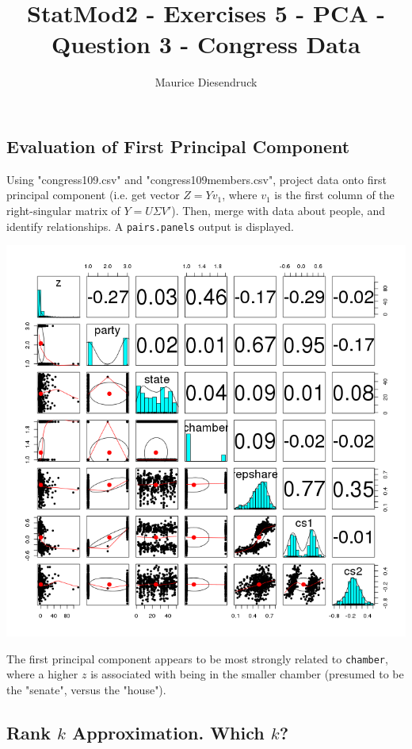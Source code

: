 \documentclass[12pt,letterpaper]{article}\usepackage[]{graphicx}\usepackage[]{color}
\author{Maurice Diesendruck}
\title{StatMod2 - Exercises 5 - PCA - Question 3 - Congress Data}
\begin{document}
\maketitle
\setcounter{section}{3}

\subsection{Evaluation of First Principal Component}

  Using "congress109.csv" and "congress109members.csv", project data onto first
  principal component (i.e. get vector $Z=Yv_1$, where $v_1$ is the first column 
  of the right-singular matrix of $Y=U \Sigma V'$). Then, merge with data about
  people, and identify relationships. A \texttt{pairs.panels} output is 
  displayed.
  
  \includegraphics[width=.9\textwidth, keepaspectratio]{pca-pairs-panels.png}
  
  The first principal component appears to be most strongly related to 
  \texttt{chamber}, where a higher $z$ is associated with being in the smaller
  chamber (presumed to be the "senate", versus the "house").
  
\newpage
\subsection{Rank $k$ Approximation. Which $k$?}
\end{document}
